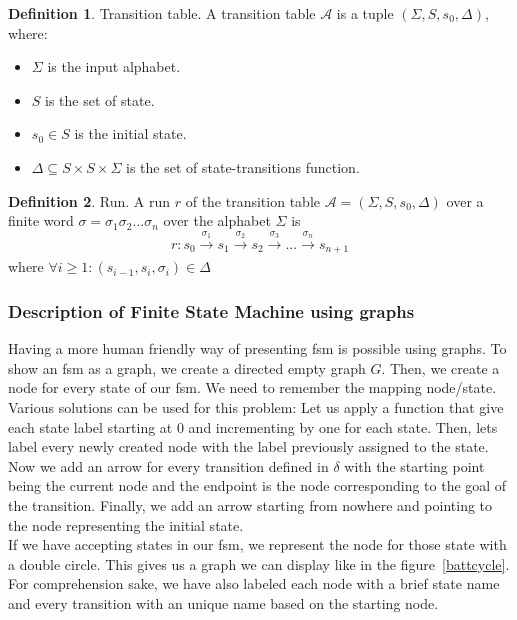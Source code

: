 \documentclass[12pt]{article}
\theoremstyle{definition}
\newtheorem{definition}{Definition}[section]
\theoremstyle{definition}
\newcommand{\A}{\mathcal{A}}
\begin{document}
\theoremstyle{definition}
\begin{definition}{Transition table.} A transition table $\A$ is a tuple $(\Sigma, S, s_{0}, \Delta)$, where:
\begin{itemize}
\item $\Sigma$ is the input alphabet.
\item $S$ is the set of state.
\item $s_{0} \in S$ is the initial state.
\item $\Delta \subseteq S \times S \times \Sigma$ is the set of state-transitions function.
\end{itemize}
\end{definition}

\theoremstyle{definition}
\begin{definition}{Run.} A run $r$ of the transition table $\A = (\Sigma, S, s_{0}, \Delta)$ over a finite word $\sigma = \sigma_1 \sigma_2 ... \sigma_n$ over the alphabet $\Sigma$ is
$$r: s_0 \xrightarrow[]{\sigma_1} s_1 \xrightarrow[]{\sigma_2} s_2 \xrightarrow[]{\sigma_3} ... \xrightarrow[]{\sigma_n} s_{n+1}$$ where $\forall i \ge 1: (s_{i-1}, s_i, \sigma_i) \in \Delta$
\end{definition}

\subsubsection{Description of Finite State Machine using graphs}

Having a more human friendly way of presenting \gls{fsm} is possible using graphs. To show an \gls{fsm} as a graph, we create a directed empty graph $G$. Then, we create a node for every state of our \gls{fsm}. We need to remember the mapping node/state. Various solutions can be used for this problem: Let us apply a function that give each state label starting at 0 and incrementing by one for each state. Then, lets label every newly created node with the label previously assigned to the state.\\

Now we add an arrow for every transition defined in $\delta$ with the starting point being the current node and the endpoint is the node corresponding to the goal of the transition. Finally, we add an arrow starting from nowhere and pointing to the node representing the initial state.\\

If we have accepting states in our \gls{fsm}, we represent the node for those state with a double circle. This gives us a graph we can display like in the figure~\ref{battcycle}. For comprehension sake, we have also labeled each node with a brief state name and every transition with an unique name based on the starting node.
\end{document}
